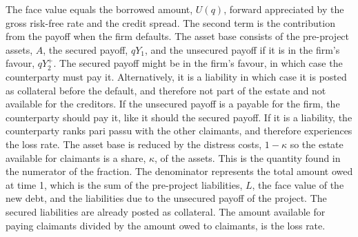\documentclass[../main.tex]{subfiles}
\begin{document}
        The face value equals the borrowed amount, $U(q)$, 
        forward appreciated by the gross risk-free rate and the credit spread.
        The second term is the contribution from the payoff when the firm defaults. 
        The asset base consists of the pre-project assets, $A$, the secured payoff, $qY_{1}$, 
        and the unsecured payoff if it is in the firm's favour, $qY_{2}^{+}$.
        The secured payoff might be in the firm's favour, in which case the counterparty must pay it. 
        Alternatively, it is a liability in which case it is posted as collateral before the default,
        and therefore not part of the estate and not available for the creditors.
        If the unsecured payoff is a payable for the firm, the counterparty should pay it, like it should the secured payoff.
        If it is a liability, the counterparty ranks pari passu with the other claimants,
        and therefore experiences the loss rate. 
        The asset base is reduced by the distress costs, $1-\kappa$ so the estate available for claimants
        is a share, $\kappa$, of the assets. 
        This is the quantity found in the numerator of the fraction.
        The denominator represents the total amount owed at time 1, 
        which is the sum of the pre-project liabilities, $L$, the face value of the new debt, 
        and the liabilities due to the unsecured payoff of the project.
        The secured liabilities are already posted as collateral.
        The amount available for paying claimants divided by the amount owed to claimants, is the loss rate.
\end{document}
